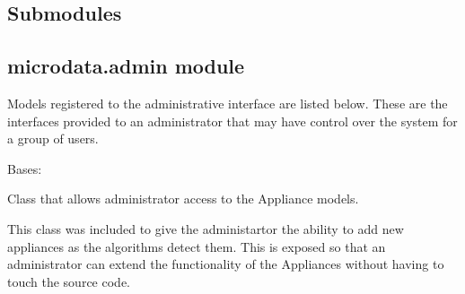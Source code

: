 \documentclass[letterpaper,10pt,english]{sphinxmanual}
\begin{document}
\subsection{Submodules}
\label{modules/microdata:submodules}

\subsection{microdata.admin module}
\label{modules/microdata:microdata-admin-module}
Models registered to the administrative interface are listed below. These are the interfaces provided to an administrator that may have control over the system for a group of users.
\label{modules/microdata:module-microdata.admin}

\begin{fulllineitems}
\label{modules/microdata:microdata.admin.ApplianceAdmin}
Bases: 

Class that allows administrator access to the Appliance models.

This class was included to give the administartor the ability to add new appliances
as the algorithms detect them. This is exposed so that an administrator can extend
the functionality of the Appliances without having to touch the source code.

\begin{fulllineitems}
\label{modules/microdata:microdata.admin.ApplianceAdmin.list_display}
\end{fulllineitems}


\begin{fulllineitems}
\label{modules/microdata:microdata.admin.ApplianceAdmin.media}
\end{fulllineitems}


\end{fulllineitems}

\end{document}
